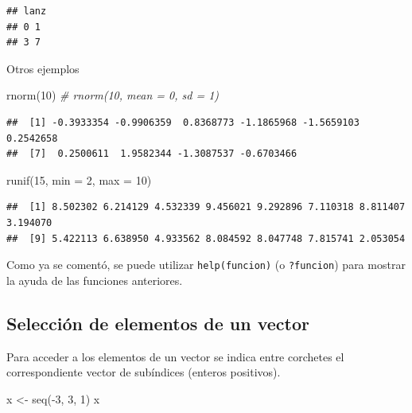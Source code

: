 \documentclass[
]{book}
\newenvironment{Shaded}{\begin{snugshade}}{\end{snugshade}}
\newcommand{\AttributeTok}[1]{\textcolor[rgb]{0.77,0.63,0.00}{#1}}
\newcommand{\CommentTok}[1]{\textcolor[rgb]{0.56,0.35,0.01}{\textit{#1}}}
\newcommand{\DecValTok}[1]{\textcolor[rgb]{0.00,0.00,0.81}{#1}}
\newcommand{\FunctionTok}[1]{\textcolor[rgb]{0.00,0.00,0.00}{#1}}
\newcommand{\NormalTok}[1]{#1}
\newcommand{\OtherTok}[1]{\textcolor[rgb]{0.56,0.35,0.01}{#1}}
\newcommand{\SpecialCharTok}[1]{\textcolor[rgb]{0.00,0.00,0.00}{#1}}
\theoremstyle{break}
\theoremstyle{nonumberplain}
\begin{document}
\begin{verbatim}
## lanz
## 0 1 
## 3 7
\end{verbatim}

Otros ejemplos

\begin{Shaded}
\begin{Highlighting}[]
\FunctionTok{rnorm}\NormalTok{(}\DecValTok{10}\NormalTok{)  }\CommentTok{\# rnorm(10, mean = 0, sd = 1)}
\end{Highlighting}
\end{Shaded}

\begin{verbatim}
##  [1] -0.3933354 -0.9906359  0.8368773 -1.1865968 -1.5659103  0.2542658
##  [7]  0.2500611  1.9582344 -1.3087537 -0.6703466
\end{verbatim}

\begin{Shaded}
\begin{Highlighting}[]
\FunctionTok{runif}\NormalTok{(}\DecValTok{15}\NormalTok{, }\AttributeTok{min =} \DecValTok{2}\NormalTok{, }\AttributeTok{max =} \DecValTok{10}\NormalTok{)}
\end{Highlighting}
\end{Shaded}

\begin{verbatim}
##  [1] 8.502302 6.214129 4.532339 9.456021 9.292896 7.110318 8.811407 3.194070
##  [9] 5.422113 6.638950 4.933562 8.084592 8.047748 7.815741 2.053054
\end{verbatim}

Como ya se comentó, se puede utilizar \texttt{help(funcion)} (o \texttt{?funcion}) para mostrar la ayuda de las funciones anteriores.

\hypertarget{selecciuxf3n-de-elementos-de-un-vector}{%
\subsection{Selección de elementos de un vector}\label{selecciuxf3n-de-elementos-de-un-vector}}

Para acceder a los elementos de un vector se indica entre corchetes el
correspondiente vector de subíndices (enteros positivos).

\begin{Shaded}
\begin{Highlighting}[]
\NormalTok{x }\OtherTok{\textless{}{-}} \FunctionTok{seq}\NormalTok{(}\SpecialCharTok{{-}}\DecValTok{3}\NormalTok{, }\DecValTok{3}\NormalTok{, }\DecValTok{1}\NormalTok{)}
\NormalTok{x}
\end{Highlighting}
\end{Shaded}
\end{document}
